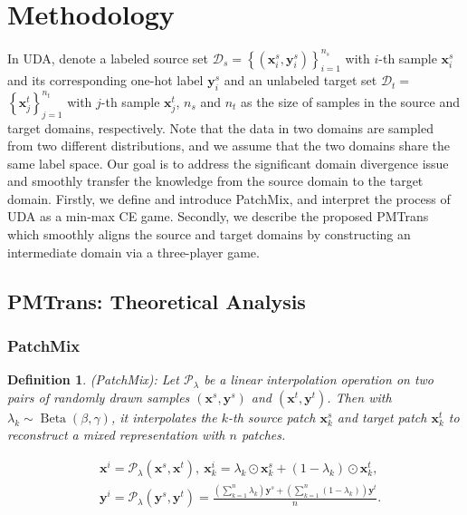 \documentclass[10pt,twocolumn,letterpaper, ]{article}
\newtheorem{definition}{Definition}
\begin{document}
\vspace{-4pt}
\section{Methodology}\label{Methodology}
\vspace{-4pt}
In UDA, denote a labeled source set $\mathcal{D}_{s}=\left\{\left(\boldsymbol{x}^{s}_{i}, \boldsymbol{y}^{s}_{i}\right)\right\}_{i=1}^{n_{s}}$ with $i$-th sample $\boldsymbol{x}_{i}^{s} $ and its corresponding one-hot label $\boldsymbol{y}_{i}^{s}$ and an unlabeled target set $\mathcal{D}_{t}=$ $\left\{\boldsymbol{x}^{t}_{j}\right\}_{j=1}^{n_{t}}$ with $j$-th sample $\boldsymbol{x}_{j}^{t}$, $n_{s}$ and $n_{t}$ as the size of samples in the source and target domains, respectively. Note that the data in two domains are sampled from two different distributions, and we assume that the two domains share the same label space. Our goal is to address the significant domain divergence issue and smoothly transfer the knowledge from the source domain to the target domain. Firstly, we define and introduce PatchMix, and interpret the process of UDA as a min-max CE game. Secondly, we describe the proposed PMTrans which smoothly aligns the source and target domains by constructing an intermediate domain via a three-player game. 
\subsection{PMTrans: Theoretical Analysis}
\label{sub:PMTrans}
\subsubsection{PatchMix}




\begin{definition}
\label{Def: Mixup}
(PatchMix): Let $\mathcal{P}_{\lambda}$ be a linear interpolation operation on two pairs of randomly drawn samples $(\boldsymbol{x}^{s}, \boldsymbol{y}^{s})$ and $(\boldsymbol{x}^{t}, \boldsymbol{y}^{t})$. Then with $\lambda_k \sim \operatorname{Beta}(\beta, \gamma)$, it interpolates the $k$-th source patch $\boldsymbol{x}_k^{s}$ and target patch $\boldsymbol{x}_k^{t}$ to reconstruct a mixed representation with $n$ patches.
\begin{small}
\begin{equation}
\begin{aligned}
\label{eq:mixup_eq}
   &\boldsymbol{x}^{i}=\mathcal{P}_\lambda(\boldsymbol{x}^s, \boldsymbol{x}^t), ~\boldsymbol{x}^{i}_{k}=\lambda_{k} \odot \boldsymbol{x}_k^s + (1-\lambda_k)\odot\boldsymbol{x}_k^t,  \\ 
   &\boldsymbol{y}^{i}=\mathcal{P}_\lambda(\boldsymbol{y}^s, \boldsymbol{y}^t) = \frac{(\sum_{k=1}^{n}\lambda_{k})\boldsymbol{y}^s + (\sum_{k=1}^{n}(1-\lambda_{k}))\boldsymbol{y}^t}{n}. 
\end{aligned}
\end{equation}
\end{small}
\end{definition}
\end{document}
